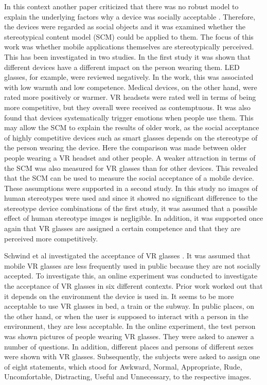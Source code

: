 \documentclass[sigchi]{acmart}
\begin{document}
In this context another paper criticized that there was no robust model to explain the underlying factors why a device was socially acceptable \cite{schwind2019understanding}. Therefore, the devices were regarded as social objects and it was examined whether the stereotypical content model (SCM) could be applied to them. The focus of this work was whether mobile applications themselves are stereotypically perceived. This has been investigated in two studies. In the first study it was shown that different devices have a different impact on the person wearing them. LED glasses, for example, were reviewed negatively. In the work, this was associated with low warmth and low competence. Medical devices, on the other hand, were rated more positively or warmer. VR headsets were rated well in terms of being more competitive, but they overall were received as contemptuous. It was also found that devices systematically trigger emotions when people use them. This may allow the SCM to explain the results of older work, as the social acceptance of highly competitive devices such as smart glasses depends on the stereotype of the person wearing the device. Here the comparison was made between older people wearing a VR headset and other people. A weaker attraction in terms of the SCM was also measured for VR glasses than for other devices. This revealed that the SCM can be used to measure the social acceptance of a mobile device. These assumptions were supported in a second study. In this study no images of human stereotypes were used and since it showed no significant difference to the stereotype device combinations of the first study, it was assumed that a possible effect of human stereotype images is negligible. In addition, it was supported once again that VR glasses are assigned a certain competence and that they are perceived more competitively.

Schwind et al investigated the acceptance of VR glasses \cite{schwind2018virtual}. It was assumed that mobile VR glasses are less frequently used in public because they are not socially accepted. To investigate this, an online experiment was conducted to investigate the acceptance of VR glasses in six different contexts. Prior work worked out that it depends on the environment the device is used in. It seems to be more acceptable to use VR glasses in bed, a train or the subway. In public places, on the other hand, or when the user is supposed to interact with a person in the environment, they are less acceptable. 
In the online experiment, the test person was shown pictures of people wearing VR glasses. They were asked to answer a number of questions. In addition, different places and persons of different sexes were shown with VR glasses. Subsequently, the subjects were asked to assign one of eight statements, which stood for Awkward, Normal, Appropriate, Rude, Uncomfortable, Distracting, Useful and Unnecessary, to the respective images.
\end{document}
